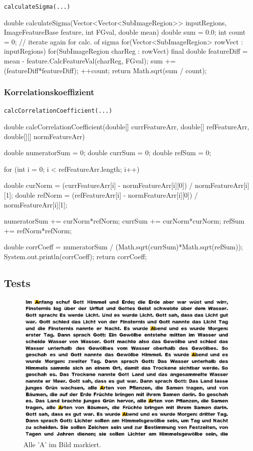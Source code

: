 \documentclass[german,notitlepage,smartquotes]{hgbreport}
\begin{document}
\begin{program}[h]
\caption{\texttt{calculateSigma(...)}}
\label{prog:calc-sigma}
\begin{JavaCode}
double calculateSigma(Vector<Vector<SubImageRegion>> inputRegions, ImageFeatureBase feature, int FGval, double mean) {
	double sum = 0.0;
	int count = 0;
	// iterate again for calc. of sigma
	for(Vector<SubImageRegion> rowVect : inputRegions) {
		for(SubImageRegion charReg : rowVect) {
			final double featureDiff = mean - feature.CalcFeatureVal(charReg, FGval);
			sum += (featureDiff*featureDiff);
			++count;
		}
	}
	return Math.sqrt(sum / count);
}
\end{JavaCode}
\end{program}

\subsubsection{Korrelationskoeffizient}

\begin{program}[h]
\caption{\texttt{calcCorrelationCoefficient(...)}}
\label{prog:calc-corr-coeff}
\begin{JavaCode}
double calcCorrelationCoefficient(double[] currFeatureArr, double[] refFeatureArr, double[][] normFeatureArr) {
	double numeratorSum = 0;
	double currSum = 0;
	double refSum = 0;

	for (int i = 0; i < refFeatureArr.length; i++) {
		double curNorm = (currFeatureArr[i] - normFeatureArr[i][0]) / normFeatureArr[i][1];
		double refNorm = (refFeatureArr[i] - normFeatureArr[i][0]) / normFeatureArr[i][1];

		numeratorSum += curNorm*refNorm;
		currSum += curNorm*curNorm;
		refSum += refNorm*refNorm;
	}
	double corrCoeff = numeratorSum / (Math.sqrt(currSum)*Math.sqrt(refSum));
	System.out.println(corrCoeff);
	return corrCoeff;
}
\end{JavaCode}
\end{program}


\clearpage

\subsection{Tests}

\begin{figure}[h]
\centering
\includegraphics[width=.7\textwidth]{test-01-A}
\caption{Alle 'A' im Bild markiert.}
\label{fig:test-01}
\end{figure}
\end{document}
